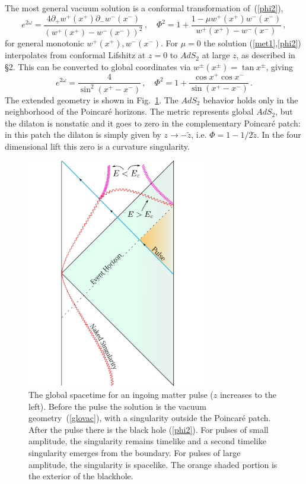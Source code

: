 \documentclass[12pt]{article}
\newcommand{\be}{\begin{equation}}
\newcommand{\ee}{\end{equation}}
\begin{document}
The most general vacuum solution is a conformal transformation of~(\ref{phi2}), 
\be
e^{2\omega} = \frac{4\partial_+ w^+(x^+) \partial_- w^-(x^-)}{\left( w^+(x^+) - w^-(x^-) \right)^2} \,,\quad
\Phi^2 = 1 + \frac{1  - \mu w^+(x^+) w^-( x^-)}{w^+(x^+) - w^-(x^-)} \,, \label{genvac}
\ee
for general monotonic $w^+(x^+), w^-(x^-)$.
For $\mu = 0$ the solution (\ref{met1},\ref{phi2}) interpolates from conformal Lifshitz at $z = 0$ to $AdS_2$ at large $z$, as described in \S2.
This can be converted to global coordinates via $w^\pm(x^\pm) = \tan x^{\pm}$, giving
\be
e^{2\omega} = \frac{4}{\sin^2(x^+ - x^-)} \,,\quad
\Phi^2 = 1 + \frac{\cos x^+ \cos x^-}{\sin(x^+ - x^-)} \,.
\label{glovac}
\ee
The extended geometry is shown in Fig.~\ref{globalpic}.  The $AdS_2$ behavior holds only in the neighborhood of the Poincar\'e horizons.  The metric represents global $AdS_2$, but the dilaton is nonstatic and it goes to zero in the complementary Poincar\'e patch:  in this patch the dilaton is simply given by $z \to - \tilde z$, i.e. $\Phi = 1 - 1/2 \tilde z$.   In the four dimensional lift this zero is a curvature singularity. 
\begin{figure}[!t]
    \begin{center}  
     \includegraphics[width=8cm]{Main7OTP.pdf}  
    \end{center}
 \caption{The global spacetime for an ingoing matter pulse ($z$ increases to the left).  Before the pulse the solution is the vacuum geometry~(\ref{glovac}), with a singularity outside the Poincar\'e patch.  After the pulse there is the black hole (\ref{phi2}).   For pulses of small amplitude, the singularity remains timelike and a second timelike singularity emerges from the boundary.  For pulses of large amplitude, the singularity is spacelike. The orange shaded portion is the exterior of the blackhole. \label{globalpic}}
  \hfill
\end{figure}
\end{document}

